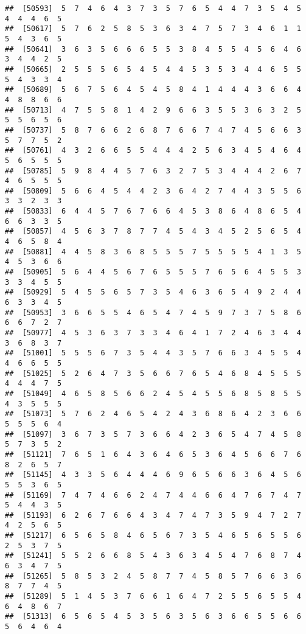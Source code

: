 \documentclass[
]{book}
\begin{document}
\begin{verbatim}
##  [50593]  5  7  4  6  4  3  7  3  5  7  6  5  4  4  7  3  5  4  5  4  4  4  6  5
##  [50617]  5  7  6  2  5  8  5  3  6  3  4  7  5  7  3  4  6  1  1  5  4  3  6  5
##  [50641]  3  6  3  5  6  6  6  5  5  3  8  4  5  5  4  5  6  4  6  3  4  4  2  5
##  [50665]  2  5  5  5  6  5  4  5  4  4  5  3  5  3  4  4  6  5  5  5  4  3  3  4
##  [50689]  5  6  7  5  6  4  5  4  5  8  4  1  4  4  4  3  6  6  4  4  8  8  6  6
##  [50713]  4  7  5  5  8  1  4  2  9  6  6  3  5  5  3  6  3  2  5  5  5  6  5  6
##  [50737]  5  8  7  6  6  2  6  8  7  6  6  7  4  7  4  5  6  6  3  5  7  7  5  2
##  [50761]  4  3  2  6  6  5  5  4  4  4  2  5  6  3  4  5  4  6  4  5  6  5  5  5
##  [50785]  5  9  8  4  4  5  7  6  3  2  7  5  3  4  4  4  2  6  7  4  6  5  5  5
##  [50809]  5  6  6  4  5  4  4  2  3  6  4  2  7  4  4  3  5  5  6  3  3  2  3  3
##  [50833]  6  4  4  5  7  6  7  6  6  4  5  3  8  6  4  8  6  5  4  6  6  3  3  5
##  [50857]  4  5  6  3  7  8  7  7  4  5  4  3  4  5  2  5  6  5  4  4  6  5  8  4
##  [50881]  4  4  5  8  3  6  8  5  5  5  7  5  5  5  5  4  1  3  5  4  5  3  6  6
##  [50905]  5  6  4  4  5  6  7  6  5  5  5  7  6  5  6  4  5  5  3  3  3  4  5  5
##  [50929]  5  4  5  5  6  5  7  3  5  4  6  3  6  5  4  9  2  4  4  6  3  3  4  5
##  [50953]  3  6  6  5  5  4  6  5  4  7  4  5  9  7  3  7  5  8  6  6  6  7  2  7
##  [50977]  4  5  3  6  3  7  3  3  4  6  4  1  7  2  4  6  3  4  4  3  6  8  3  7
##  [51001]  5  5  5  6  7  3  5  4  4  3  5  7  6  6  3  4  5  5  4  4  6  6  5  5
##  [51025]  5  2  6  4  7  3  5  6  6  7  6  5  4  6  8  4  5  5  5  4  4  4  7  5
##  [51049]  4  6  5  8  5  6  6  2  4  5  4  5  5  6  8  5  8  5  5  4  3  5  5  5
##  [51073]  5  7  6  2  4  6  5  4  2  4  3  6  8  6  4  2  3  6  6  5  5  5  6  4
##  [51097]  3  6  7  3  5  7  3  6  6  4  2  3  6  5  4  7  4  5  8  5  7  3  5  2
##  [51121]  7  6  5  1  6  4  3  6  4  6  5  3  6  4  5  6  6  7  6  8  2  6  5  7
##  [51145]  4  3  3  5  6  4  4  4  6  9  6  5  6  6  3  6  4  5  6  5  5  3  6  5
##  [51169]  7  4  7  4  6  6  2  4  7  4  4  6  6  4  7  6  7  4  7  5  4  4  3  5
##  [51193]  6  2  6  7  6  6  4  3  4  7  4  7  3  5  9  4  7  2  7  4  2  5  6  5
##  [51217]  6  5  6  5  8  4  6  5  6  7  3  5  4  6  5  6  5  5  6  2  5  3  7  5
##  [51241]  5  5  2  6  6  8  5  4  3  6  3  4  5  4  7  6  8  7  4  6  3  4  7  5
##  [51265]  5  8  5  3  2  4  5  8  7  7  4  5  8  5  7  6  6  3  6  8  7  7  4  5
##  [51289]  5  1  4  5  3  7  6  6  1  6  4  7  2  5  5  6  5  5  4  6  4  8  6  7
##  [51313]  6  5  6  5  4  5  3  5  6  3  5  6  3  6  6  5  5  6  6  5  6  4  6  4

\end{verbatim}
\end{document}
